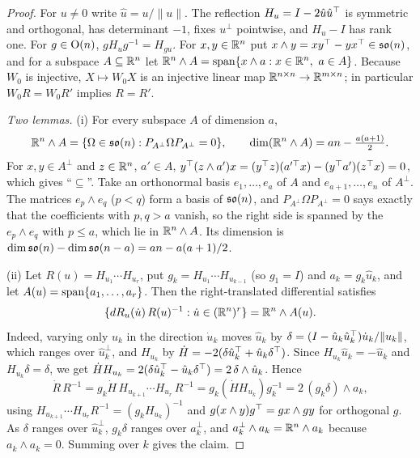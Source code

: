 \begin{proof}
For $u\ne0$ write $\hat u=u/\lVert u\rVert$. The reflection $H_u=I-2\hat u\hat u^{\top}$ is symmetric and orthogonal, has
determinant $-1$, fixes $u^\perp$ pointwise, and $H_u-I$ has rank one. For $g\in\mathrm{O}(n)$, $gH_ug^{-1}=H_{gu}$. For
$x,y\in\mathbb{R}^n$ put $x\wedge y=xy^{\top}-yx^{\top}\in\mathfrak{so}(n)$, and for a subspace $A\subseteq\mathbb{R}^n$ let
$\mathbb{R}^n\wedge A=\operatorname{span}\{x\wedge a:x\in\mathbb{R}^n,\ a\in A\}$. Because $W_0$ is injective, $X\mapsto W_0X$ is an injective linear map
$\mathbb{R}^{n\times n}\to\mathbb{R}^{m\times n}$; in particular $W_0R=W_0R'$ implies $R=R'$.

\emph{Two lemmas.} (i) For every subspace $A$ of dimension $a$,
\begin{equation*}
  \mathbb{R}^n\wedge A=\{\Omega\in\mathfrak{so}(n):P_{A^\perp}\Omega P_{A^\perp}=0\},\qquad\dim(\mathbb{R}^n\wedge A)=an-\tfrac{a(a+1)}2 .
\end{equation*}
For $x,y\in A^\perp$ and $z\in\mathbb{R}^n$, $a'\in A$, $y^{\top}(z\wedge a')x=(y^{\top} z)(a'^{\top}x)-(y^{\top} a')(z^{\top} x)=0$, which gives
``$\subseteq$''. Take an orthonormal basis $e_1,\dots,e_a$ of $A$ and $e_{a+1},\dots,e_n$ of $A^\perp$. The matrices
$e_p\wedge e_q$ ($p<q$) form a basis of $\mathfrak{so}(n)$, and $P_{A^\perp}\Omega P_{A^\perp}=0$ says exactly that the coefficients
with $p,q>a$ vanish, so the right side is spanned by the $e_p\wedge e_q$ with $p\le a$, which lie in $\mathbb{R}^n\wedge A$. Its
dimension is $\dim\mathfrak{so}(n)-\dim\mathfrak{so}(n-a)=an-a(a+1)/2$.

(ii) Let $R(u)=H_{u_1}\cdots H_{u_r}$, put $g_k=H_{u_1}\cdots H_{u_{k-1}}$ (so $g_1=I$) and $a_k=g_k\hat u_k$, and let
$A(u)=\operatorname{span}\{a_1,\dots,a_r\}$. Then the right-translated differential satisfies
\begin{equation*}
  \{dR_u(\dot u)\,R(u)^{-1}:\dot u\in(\mathbb{R}^n)^r\}=\mathbb{R}^n\wedge A(u).
\end{equation*}
Indeed, varying only $u_k$ in the direction $\dot u_k$ moves $\hat u_k$ by $\delta=(I-\hat u_k\hat u_k^{\top})\dot u_k/\lVert
u_k\rVert$, which ranges over $\hat u_k^\perp$, and $H_{u_k}$ by $\dot H=-2(\delta\hat u_k^{\top}+\hat u_k\delta^{\top})$. Since
$H_{u_k}\hat u_k=-\hat u_k$ and $H_{u_k}\delta=\delta$, we get $\dot HH_{u_k}=2(\delta\hat u_k^{\top}-\hat u_k\delta^{\top})=2\,\delta\wedge
\hat u_k$. Hence
\begin{equation*}
  \dot R\,R^{-1}=g_k\dot H\,H_{u_{k+1}}\cdots H_{u_r}\,R^{-1}=g_k(\dot HH_{u_k})g_k^{-1}=2\,(g_k\delta)\wedge a_k ,
\end{equation*}
using $H_{u_{k+1}}\cdots H_{u_r}R^{-1}=(g_kH_{u_k})^{-1}$ and $g(x\wedge y)g^{\top}=gx\wedge gy$ for orthogonal $g$. As
$\delta$ ranges over $\hat u_k^\perp$, $g_k\delta$ ranges over $a_k^\perp$, and $a_k^\perp\wedge a_k=\mathbb{R}^n\wedge a_k$
because $a_k\wedge a_k=0$. Summing over $k$ gives the claim.


\end{proof}
